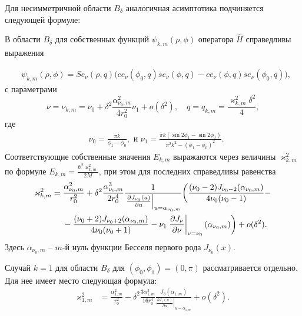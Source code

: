 Для несимметричной области $B_\delta$  аналогичная асимптотика подчиняется следующей формуле:
\begin{theorem}
В области  $B_\delta$ для собственных функций $\psi_{k, m}(\rho, \phi)$ оператора $\hat{H}$ справедливы выражения

\begin{align}
&\psi_{k, m}(\rho, \phi) = 
    Se_\nu(\rho, q) \biggl( ce_\nu(\phi_0, q) se_\nu(\phi, q) -ce_\nu(\phi, q) se_\nu(\phi_0, q) \biggr) ,  \label{eq:funB}
\end{align}
с параметрами
\begin{equation*}    
\nu = \nu_{k,m} = \nu_0 +\delta^2 \frac{\alpha_{\nu_0, m}^2}{4 r_0^2} \nu_1 + o(\delta^2), \quad q=q_{k,m} = \frac{\varkappa_{k,m}^2 \delta^2}{4},
\end{equation*}
где
\begin{align*}
& \nu_0 = \frac{\pi k}{\phi_1-\phi_0},\text{\ \ и \ \ }
\nu_1= \frac{\pi k (\sin 2\phi_1 - \sin 2 \phi_0)}{\pi^2k^2-(\phi_1-\phi_0)^2} .
\end{align*}
Соответствующие собственные значения $E_{k, m}$ выражаются через величины $\varkappa^2_{k, m}$ по формуле $E_{k, m} =  \frac{\hbar^2 \varkappa^2_{k, m}}{2M}$, при этом для последних  справедливы равенства
\begin{align}
\varkappa_{k, m}^2 ={}& \frac{\alpha_{\nu_0, m}^2}{r_0^2} +  \delta^2 \frac{\alpha_{\nu_0, m}^3}{2 r_0^4}\frac{1}{ \left.\frac{\partial J_{\nu_0}(u)}{\partial u}\right|_{u=\alpha_{\nu_0, m}} }  
 \biggl(\frac{(\nu_0 - 2)J_{\nu_0-2}(\alpha_{\nu_0, m})   }{4\nu_0 (\nu_0-1)} -
\notag \\ 
&{}- \frac{(\nu_0 + 2)J_{\nu_0+2}(\alpha_{\nu_0, m})}{4\nu_0 (\nu_0+1)} 
- \nu_1 \left.\frac{\partial J_\nu}{\partial \nu}\right|_{\nu = \nu_0}(\alpha_{\nu_0, m})
    \biggr) + o(\delta^2).\label{eq:valB}
\end{align}
Здесь $\alpha_{\nu_0,m}$ -- $m$-й нуль функции Бесселя первого рода $J_{\nu_0}(x)$.
\end{theorem}

Случай $k=1$ для области $B_\delta$ для $(\phi_0, \phi_1)=(0,\pi)$  рассматривается отдельно. Для нее имеет место следующая формула:
\begin{align}
     \varkappa_{1, m}^2& = \frac{\alpha_{1, m}^2}{r_0^2} - \delta^2 \frac{3\alpha_{1, m}^3}{16r_0^4} 
    \frac{J_3(\alpha_{1, m})}{\left.\frac{\partial J_1 (u)}{\partial u}\right|_{u=\alpha_{1, m}}} 
    + o(\delta^2).  \label{eq:valS2}
\end{align}

